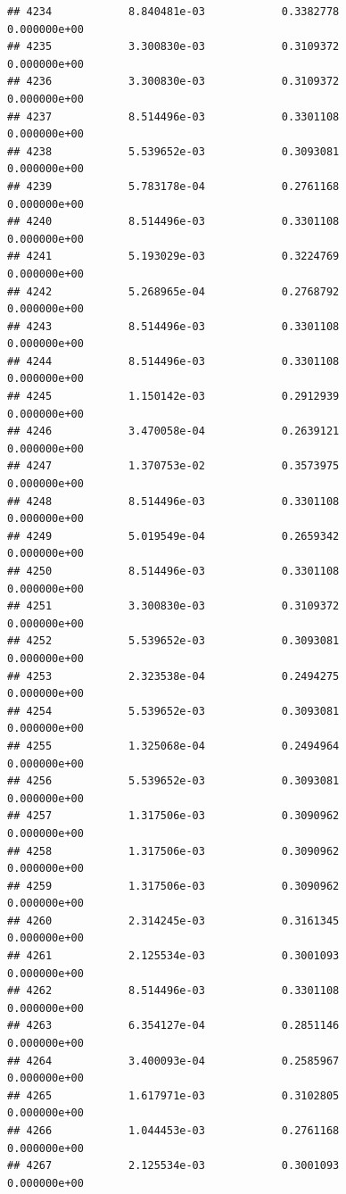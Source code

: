 \documentclass[
]{article}
\begin{document}
\begin{verbatim}
## 4234            8.840481e-03            0.3382778            0.000000e+00
## 4235            3.300830e-03            0.3109372            0.000000e+00
## 4236            3.300830e-03            0.3109372            0.000000e+00
## 4237            8.514496e-03            0.3301108            0.000000e+00
## 4238            5.539652e-03            0.3093081            0.000000e+00
## 4239            5.783178e-04            0.2761168            0.000000e+00
## 4240            8.514496e-03            0.3301108            0.000000e+00
## 4241            5.193029e-03            0.3224769            0.000000e+00
## 4242            5.268965e-04            0.2768792            0.000000e+00
## 4243            8.514496e-03            0.3301108            0.000000e+00
## 4244            8.514496e-03            0.3301108            0.000000e+00
## 4245            1.150142e-03            0.2912939            0.000000e+00
## 4246            3.470058e-04            0.2639121            0.000000e+00
## 4247            1.370753e-02            0.3573975            0.000000e+00
## 4248            8.514496e-03            0.3301108            0.000000e+00
## 4249            5.019549e-04            0.2659342            0.000000e+00
## 4250            8.514496e-03            0.3301108            0.000000e+00
## 4251            3.300830e-03            0.3109372            0.000000e+00
## 4252            5.539652e-03            0.3093081            0.000000e+00
## 4253            2.323538e-04            0.2494275            0.000000e+00
## 4254            5.539652e-03            0.3093081            0.000000e+00
## 4255            1.325068e-04            0.2494964            0.000000e+00
## 4256            5.539652e-03            0.3093081            0.000000e+00
## 4257            1.317506e-03            0.3090962            0.000000e+00
## 4258            1.317506e-03            0.3090962            0.000000e+00
## 4259            1.317506e-03            0.3090962            0.000000e+00
## 4260            2.314245e-03            0.3161345            0.000000e+00
## 4261            2.125534e-03            0.3001093            0.000000e+00
## 4262            8.514496e-03            0.3301108            0.000000e+00
## 4263            6.354127e-04            0.2851146            0.000000e+00
## 4264            3.400093e-04            0.2585967            0.000000e+00
## 4265            1.617971e-03            0.3102805            0.000000e+00
## 4266            1.044453e-03            0.2761168            0.000000e+00
## 4267            2.125534e-03            0.3001093            0.000000e+00

\end{verbatim}
\end{document}
